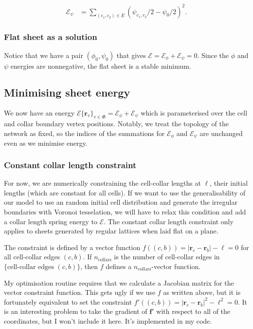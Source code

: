 \documentclass[draft]{article}
\newcommand{\e}{\mathcal{E}}
\begin{document}
\begin{align*}
    \e_\psi &= \sum_{(c_1, c_2) \in E} (\psi_{c_1, c_2} / 2 - \psi_0/2)^2.
\end{align*}

\subsubsection{Flat sheet as a solution} \label{subsubsec:flat}

Notice that we have a pair $(\phi_0, \psi_0)$ that gives $\e = \e_\phi + \e_\psi = 0$. Since the $\phi$ and $\psi$ energies are nonnegative, the flat sheet is a stable minimum. 

\subsection{Minimising sheet energy}

We now have an energy $\e\{ \bm{r}_v \}_{v \in \mathfrak{G}} = \e_\phi + \e_\psi$ which is parameterised over the cell and collar boundary vertex positions. Notably, we treat the topology of the network as fixed, so the indices of the summations for $\e_\phi$ and $\e_\psi$ are unchanged even as we minimise energy.

\subsubsection{Constant collar length constraint}

For now, we are numerically constraining the cell-collar lengths at $\ell$, their initial lengths (which are constant for all cells). If we want to use the generalisability of our model to use an random initial cell distribution and generate the irregular boundaries with Voronoi tesselation, we will have to relax this condition and add a collar length spring energy to $\e$. The constant collar length constraint only applies to sheets generated by regular lattices when laid flat on a plane.

The constraint is defined by a vector function $f((c, b)) = |\bm{r}_c - \bm{r}_b| - \ell = 0$ for all cell-collar edges $(c, b)$. If $n_{\text{collars}}$ is the number of cell-collar edges in $\{\text{cell-collar edges }(c,b) \}$, then $f$ defines a $n_{\text{collars}}$-vector function. 

My optimisation routine requires that we calculate a Jacobian matrix for the vector constraint function. This gets ugly if we use $f$ as written above, but it is fortunately equivalent to set the constraint $f'((c, b)) = |\bm{r}_c - \bm{r}_b|^2 - \ell^2 = 0$. It is an interesting problem to take the gradient of $\bm{f'}$ with respect to all of the coordinates, but I won't include it here. It's implemented in my code.
\end{document}
